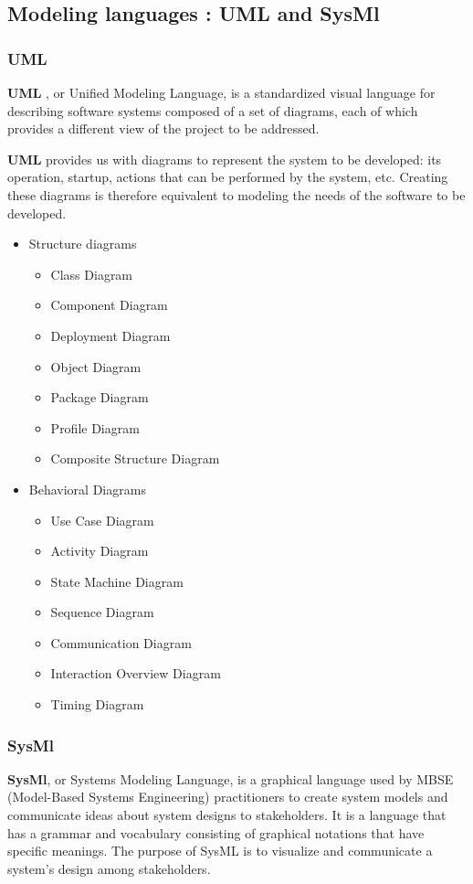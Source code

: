 \subsection{Modeling languages : UML and SysMl}
\subsubsection{UML}

\textbf{UML} , or Unified Modeling Language, is a standardized visual language for describing software systems composed of a set of diagrams, each of which provides a different view of the project to be addressed.\cite{HMB03}

\textbf{UML}  provides us with diagrams to represent the system to be developed: its operation, startup, actions that can be performed by the system, etc. Creating these diagrams is therefore equivalent to modeling the needs of the software to be developed.\cite{HMB03}

\begin{itemize}
\item Structure diagrams 
\begin{itemize}
\item Class Diagram
\item Component Diagram
\item Deployment Diagram
\item Object Diagram
\item Package Diagram
\item Profile Diagram
\item Composite Structure Diagram
\end{itemize}
\item Behavioral Diagrams
\begin{itemize}
\item Use Case Diagram
\item Activity Diagram
\item State Machine Diagram
\item Sequence Diagram
\item Communication Diagram
\item Interaction Overview Diagram
\item Timing Diagram
\end{itemize}
\end{itemize}

\subsubsection{SysMl}
\textbf{SysMl},  or Systems Modeling Language, is a graphical language used by MBSE (Model-Based Systems Engineering) practitioners to create system models and communicate ideas about system designs to stakeholders. It is a language that has a grammar and vocabulary consisting of graphical notations that have specific meanings. The purpose of SysML is to visualize and communicate a system's design among stakeholders.\cite{LD13}

